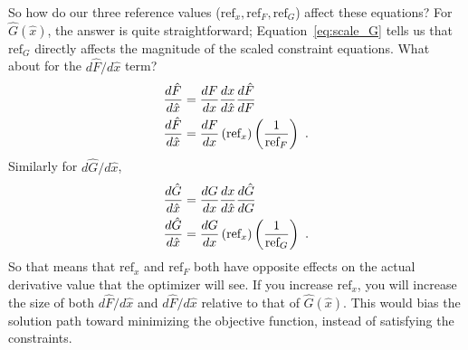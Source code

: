 \documentclass[conf]{new-aiaa}
\begin{document}
    So how do our three reference values ($\text{ref}_x, \text{ref}_F, \text{ref}_G$) affect these equations? 
    For $\hat{G}(\hat{x})$, the answer is quite straightforward; 
    Equation~\eqref{eq:scale_G} tells us that $\text{ref}_G$ directly affects the magnitude of the scaled constraint equations. 
    What about for the $d \hat{F}/d\hat{x}$ term? 
    \begin{align}
        \frac{d\hat{F}}{d\hat{x}} &= \frac{dF}{dx} \frac{dx}{d\hat{x}} \frac{d\hat{F}}{dF} \notag \\
        \frac{d\hat{F}}{d\hat{x}} &= \frac{dF}{dx} \left(\text{ref}_x \right) \left(\frac{1}{\text{ref}_F}\right) \ .
    \end{align}
    Similarly for $d \hat{G}/d\hat{x}$, 
    \begin{align}
        \frac{d\hat{G}}{d\hat{x}} &= \frac{dG}{dx} \frac{dx}{d\hat{x}} \frac{d\hat{G}}{dG} \notag \\
        \frac{d\hat{G}}{d\hat{x}} &= \frac{dG}{dx} \left(\text{ref}_x \right) \left(\frac{1}{\text{ref}_G}\right) \ .
    \end{align}
    So that means that $\text{ref}_x$ and $\text{ref}_F$ both have opposite effects on the actual derivative value that the optimizer will see. 
    If you increase $\text{ref}_x$, you will increase the size of both $d\hat{F}/d\hat{x}$ and $d\hat{F}/d\hat{x}$ relative to that of $\hat{G}(\hat{x})$. 
    This would bias the solution path toward minimizing the objective function, instead of satisfying the constraints. 
    
\end{document}
